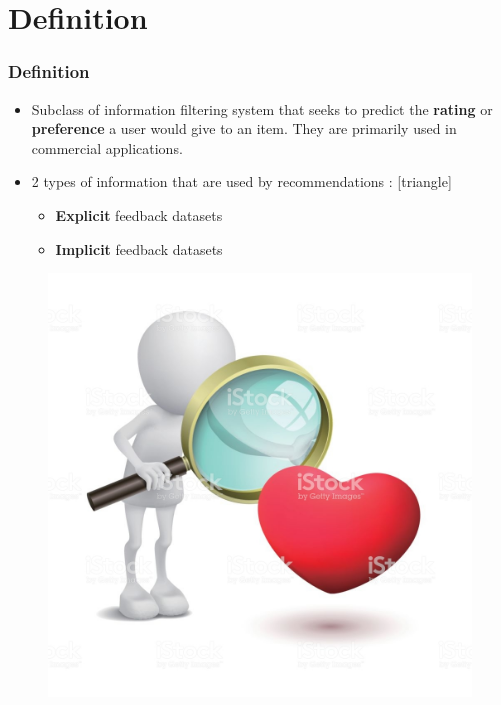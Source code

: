 \section[Definition]{Definition}
\begin{frame}
    \frametitle{Definition}
    \hspace{-1cm}
	\begin{minipage}{0.75\linewidth}
    \renewcommand{\raggedright}{\leftskip=0pt \rightskip=0pt plus 0cm}
    \begin{itemize}\itemsep1em
        \item Subclass of information filtering system that seeks to predict the \textbf{rating} or \textbf{preference} a user would give to an item. They are primarily used in commercial applications.
        \item  2 types of information that are used by recommendations :
        \vspace{1mm}
        \fontsize{9}{12}\selectfont
        [triangle]
        \begin{itemize}\itemsep0.2em
            \item \textbf{Explicit} feedback datasets
            \item \textbf{Implicit} feedback datasets
        \end{itemize}
     \end{itemize}
	 \end{minipage}
	 \begin{minipage}{0.15\linewidth}
	    \begin{figure}
            \includegraphics[scale=0.5]{figures/system.jpg}
		\end{figure}
	 \end{minipage}
\end{frame}

